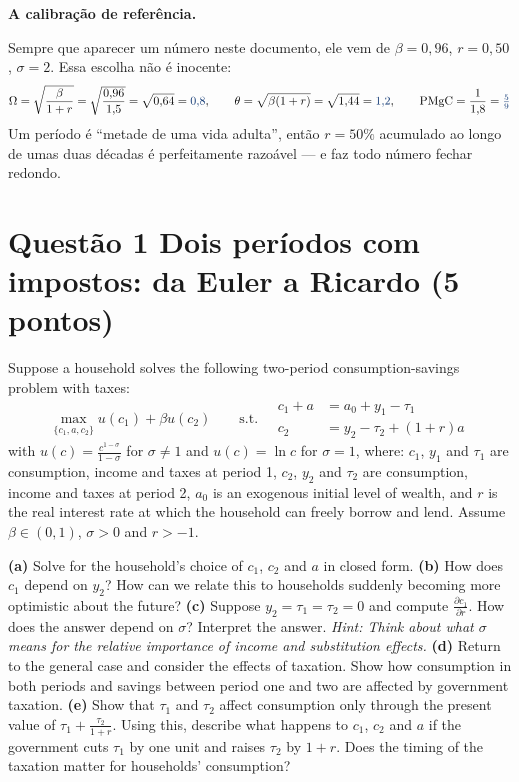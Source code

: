 \documentclass[11pt, a4paper]{article}
\newcommand{\passo}[1]{\medskip\noindent\textbf{#1}\par\nobreak}
\newcommand{\resp}[1]{%
  \ifmmode {\color{darkblue}#1}\else\textcolor{darkblue}{\textbf{#1}}\fi}
\begin{document}
\passo{A calibração de referência.}
Sempre que aparecer um número neste documento, ele vem de
$\beta=0{,}96$, $r=0{,}50$, $\sigma=2$. Essa escolha não é inocente:
$$\Omega = \sqrt{\frac{\beta}{1+r}} = \sqrt{\frac{0{,}96}{1{,}5}} = \sqrt{0{,}64} = \resp{0{,}8},
\qquad
\theta = \sqrt{\beta(1+r)} = \sqrt{1{,}44} = \resp{1{,}2},
\qquad
\mathrm{PMgC} = \frac{1}{1{,}8} = \resp{\tfrac{5}{9}}$$
Um período é ``metade de uma vida adulta'', então $r=50\%$ acumulado ao longo de umas duas
décadas é perfeitamente razoável --- e faz todo número fechar redondo.

\section[Questão 1 --- Dois períodos com impostos]{Questão 1 \quad Dois períodos com impostos: da Euler a Ricardo \hfill \normalsize (5 pontos)}

\begin{tcolorbox}[questionbox]
\small
Suppose a household solves the following two-period consumption-savings problem with taxes:
$$\max_{\{c_1,a,c_2\}} u(c_1)+\beta u(c_2)
\qquad \text{s.t.} \quad
\begin{aligned}
c_1 + a &= a_0 + y_1 - \tau_1 \\
c_2 &= y_2 - \tau_2 + (1+r)a
\end{aligned}$$
with $u(c)=\frac{c^{1-\sigma}}{1-\sigma}$ for $\sigma\neq1$ and $u(c)=\ln c$ for
$\sigma=1$, where: $c_1$, $y_1$ and $\tau_1$ are consumption, income and taxes at period 1,
$c_2$, $y_2$ and $\tau_2$ are consumption, income and taxes at period 2, $a_0$ is an
exogenous initial level of wealth, and $r$ is the real interest rate at which the household
can freely borrow and lend. Assume $\beta\in(0,1)$, $\sigma>0$ and $r>-1$.

\smallskip
\textbf{(a)} Solve for the household's choice of $c_1$, $c_2$ and $a$ in closed form.
\textbf{(b)} How does $c_1$ depend on $y_2$? How can we relate this to households suddenly
becoming more optimistic about the future?
\textbf{(c)} Suppose $y_2=\tau_1=\tau_2=0$ and compute $\frac{\partial c_1}{\partial r}$.
How does the answer depend on $\sigma$? Interpret the answer.
\emph{Hint: Think about what $\sigma$ means for the relative importance of income and
substitution effects.}
\textbf{(d)} Return to the general case and consider the effects of taxation. Show how
consumption in both periods and savings between period one and two are affected by
government taxation.
\textbf{(e)} Show that $\tau_1$ and $\tau_2$ affect consumption only through the present
value of $\tau_1+\frac{\tau_2}{1+r}$. Using this, describe what happens to $c_1$, $c_2$ and
$a$ if the government cuts $\tau_1$ by one unit and raises $\tau_2$ by $1+r$. Does the
timing of the taxation matter for households' consumption?
\end{tcolorbox}
\end{document}
